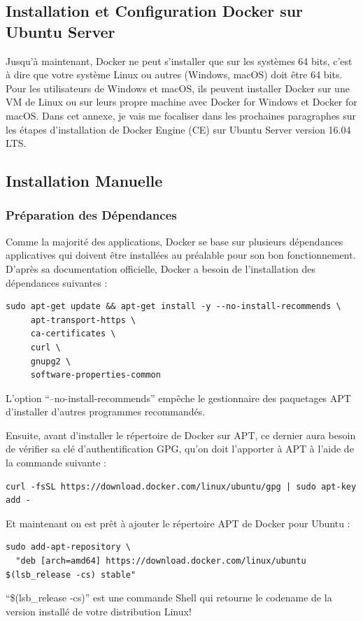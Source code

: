 \documentclass[a4paper,11pt,oneside]{report}
\begin{document}
\begin{appendices}

\chapter{Installation et Configuration Docker sur Ubuntu Server}
Jusqu'à maintenant, Docker ne peut s'installer que sur les systèmes 64 bits, c'est à dire que votre système Linux ou autres (Windows, macOS) doit être 64 bits. Pour les utilisateurs de Windows et macOS, ils peuvent installer Docker sur une VM de Linux ou sur leurs propre machine avec Docker for Windows et Docker for macOS. Dans cet annexe, je vais me focaliser dans les prochaines paragraphes sur les étapes d'installation de Docker Engine (CE) sur Ubuntu Server version 16.04 LTS.

\section{Installation Manuelle}
\subsection{Préparation des Dépendances}

Comme la majorité des applications, Docker se base sur plusieurs dépendances applicatives qui doivent être installées au préalable pour son bon fonctionnement. D'après sa documentation\cite{dockerDocs} officielle, Docker a besoin de l'installation des dépendances suivantes :
\begin{verbatim}
sudo apt-get update && apt-get install -y --no-install-recommends \
     apt-transport-https \
     ca-certificates \    
     curl \     
     gnupg2 \     
     software-properties-common
\end{verbatim}
L'option ``--no-install-recommends'' empêche le gestionnaire des paquetages APT d'installer d'autres programmes recommandés.
\newline

Ensuite, avant d'installer le répertoire de Docker sur APT, ce dernier aura besoin de vérifier sa clé d'authentification GPG, qu'on doit l'apporter à APT à l'aide de la commande suivante :
\begin{verbatim}
curl -fsSL https://download.docker.com/linux/ubuntu/gpg | sudo apt-key add -
\end{verbatim}

Et maintenant on est prêt à ajouter le répertoire APT de Docker pour Ubuntu :
\begin{verbatim}
sudo add-apt-repository \
  "deb [arch=amd64] https://download.docker.com/linux/ubuntu $(lsb_release -cs) stable"
\end{verbatim}
``\$(lsb\_release -cs)'' est une commande Shell qui retourne le codename de la version installé de votre distribution Linux!

\end{appendices}
\end{document}
